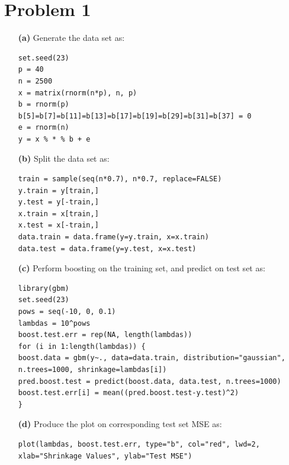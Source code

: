 \documentclass[twoside,11pt]{homework}
\begin{document}
\maketitle

\section*{Problem 1}

\begin{enumerate}
\item[\textbf{(a)}] Generate the data set as:

\begin{lstlisting}
set.seed(23)
p = 40
n = 2500
x = matrix(rnorm(n*p), n, p)
b = rnorm(p)
b[5]=b[7]=b[11]=b[13]=b[17]=b[19]=b[29]=b[31]=b[37] = 0
e = rnorm(n)
y = x % * % b + e
\end{lstlisting}

\item[\textbf{(b)}] Split the data set as:

\begin{lstlisting}
train = sample(seq(n*0.7), n*0.7, replace=FALSE)
y.train = y[train,]
y.test = y[-train,]
x.train = x[train,]
x.test = x[-train,]
data.train = data.frame(y=y.train, x=x.train)
data.test = data.frame(y=y.test, x=x.test)
\end{lstlisting}

\item[\textbf{(c)}] Perform boosting on the training set, and predict on test set as:

\begin{lstlisting}
library(gbm)
set.seed(23)
pows = seq(-10, 0, 0.1)
lambdas = 10^pows
boost.test.err = rep(NA, length(lambdas))
for (i in 1:length(lambdas)) {
boost.data = gbm(y~., data=data.train, distribution="gaussian", n.trees=1000, shrinkage=lambdas[i])
pred.boost.test = predict(boost.data, data.test, n.trees=1000)
boost.test.err[i] = mean((pred.boost.test-y.test)^2)
}
\end{lstlisting}

\item[\textbf{(d)}] Produce the plot on corresponding test set MSE as:

\begin{lstlisting}
plot(lambdas, boost.test.err, type="b", col="red", lwd=2, xlab="Shrinkage Values", ylab="Test MSE")
\end{lstlisting}


\end{enumerate}
\end{document}
